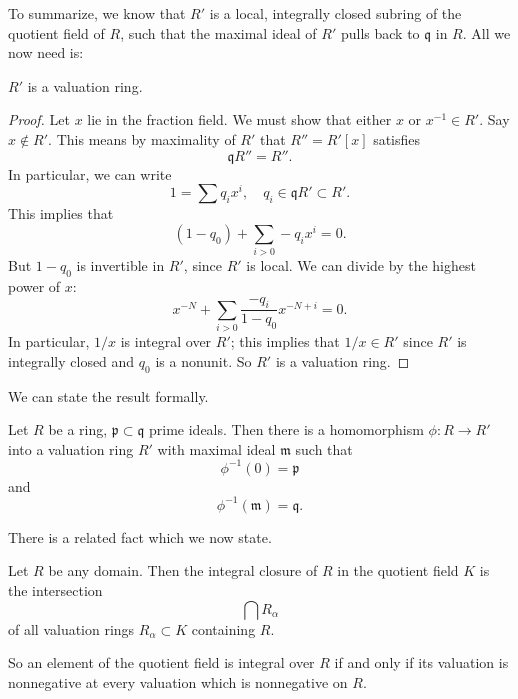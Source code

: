 To summarize, we know that $R'$ is a  local, integrally closed subring of the
quotient field of $R$, such that the maximal ideal of $R'$ pulls back to
$\mathfrak{q}$ in $R$.
All we now need is:

\begin{lemma}
$R'$ is a valuation ring.
\end{lemma}
\begin{proof}
Let $x$ lie in the fraction field. We must show that either $x$ or $x^{-1} \in
R'$.  Say $x \notin R'$.  This means by maximality of $R'$ that $R'' =
R'[x]$ satisfies
\[ \mathfrak{q}R'' = R''.  \]
In particular, we can write
\[ 1 = \sum q_i x^i, \quad q_i \in \mathfrak{q}R' \subset R'.  \]
This implies that
\[ (1-q_0) + \sum_{i > 0} -q_i x^i  = 0.  \]
But $1-q_0$ is invertible in $R'$, since $R'$ is local.  We can divide by the
highest power of $x$:
\[  x^{-N} + \sum_{i>0} \frac{-q_i}{1-q_0} x^{-N+i} = 0. \]
In particular, $1/x$ is integral over $R'$; this implies that $1/x \in
R'$ since
$R'$ is integrally closed and $q_0$ is a nonunit. So
$R'$ is a valuation ring.
\end{proof}

We can state the result formally.
\begin{theorem}
Let $R$ be a ring, $\mathfrak{p} \subset \mathfrak{q}$ prime ideals. Then there
is a homomorphism $\phi: R \to R'$ into a valuation ring $R'$ with maximal
ideal
$\mathfrak{m}$ such that
\[ \phi^{-1}(0) = \mathfrak{p}  \]
and
\[ \phi^{-1}(\mathfrak{m} ) = \mathfrak{q} .\]
\end{theorem}

There is a related fact which we now state.
\begin{theorem}
Let $R$ be any domain. Then the integral closure of $R$ in the quotient field
$K$ is the intersection
\[ \bigcap R_{\alpha}  \]
of all valuation rings $R_{\alpha} \subset K$ containing $R$.
\end{theorem}
So an element of the quotient field is integral over $R$ if and only if its
valuation is nonnegative at every valuation which is nonnegative on $R$.


